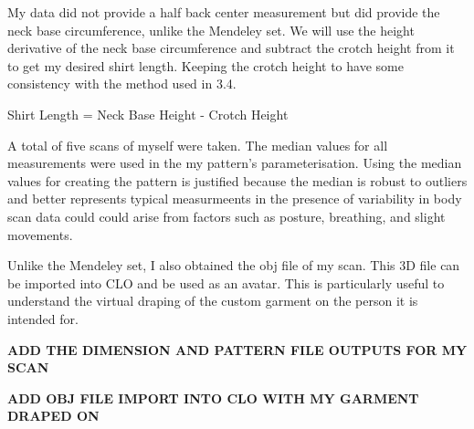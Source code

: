 My data did not provide a half back center measurement but did provide the neck base circumference, unlike the Mendeley set. We will use the height derivative of the neck base circumference and subtract the crotch height from it to get my desired shirt length. Keeping the crotch height to have some consistency with the method used in 3.4.

Shirt Length = Neck Base Height - Crotch Height

A total of five scans of myself were taken. The median values for all measurements were used in the my pattern's parameterisation. Using the median values for creating the pattern is justified because the median is robust to outliers and better represents typical measurmeents in the presence of variability in body scan data could could arise from factors such as posture, breathing, and slight movements.

Unlike the Mendeley set, I also obtained the obj file of my scan. This 3D file can be imported into CLO and be used as an avatar. This is particularly useful to understand the virtual draping of the custom garment on the person it is intended for.

\textbf{ADD THE DIMENSION AND PATTERN FILE OUTPUTS FOR MY SCAN}

\textbf{ADD OBJ FILE IMPORT INTO CLO WITH MY GARMENT DRAPED ON}